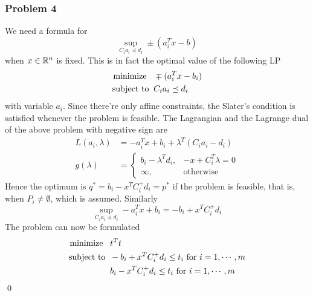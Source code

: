 \documentclass[12pt,a4paper]{article}
\newcommand{\casebrak}[4]{\left \{ \begin{array}{ll} {#1},&{#2}\\{#3},&{#4} \end{array} \right.}
\def\R{\ifmmode\mathbb R\fi}
\begin{document}
\subsubsection*{Problem 4}
We need a formula for 
$$\sup_{C_ia_i\preceq d_i} \pm(a_i^Tx - b)$$
when $x \in \R^n$ is fixed. This is in fact the optimal value of the following LP
\begin{align*}
\mbox{minimize\;\;\;} & \mp (a_i^Tx-b_i)\\
\mbox{subject to\;\;} & C_ia_i\preceq d_i
\end{align*}
with variable $a_i$. Since there're only affine constraints, the Slater's condition is satisfied whenever the problem is feasible. The Lagrangian and the Lagrange dual of the above problem with negative sign are 
\begin{align*}
L(a_i,\lambda) &= -a_i^Tx + b_i + \lambda^T(C_ia_i-d_i)\\
g(\lambda) &= \casebrak{b_i-\lambda^Td_i}{-x+C_i^T\lambda = 0}{\infty}{\mbox{otherwise}}
\end{align*}
Hence the optimum is $q^\ast = b_i-x^TC_i^+d_i = p^\ast$ if the problem is feasible, that is, when $P_i \neq \emptyset$, which is assumed. Similarly 
$$\sup_{C_ia_i\preceq d_i} -a_i^Tx + b_i = -b_i + x^TC_i^+d_i$$
The problem can now be formulated
\begin{align*}
\mbox{minimize\;\;\;} & t^Tt\\
\mbox{subject to\;\;} & -b_i + x^TC_i^+d_i \leq t_i \mbox{ for } i = 1,\cdots, m\\
& b_i - x^TC_i^+d_i \leq t_i \mbox{ for }  i = 1,\cdots, m
\end{align*}
\qed
\end{document}
